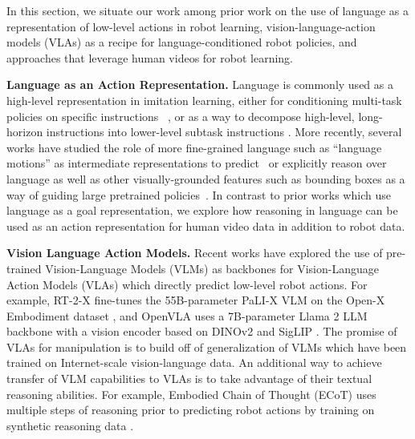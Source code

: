In this section, we situate our work among prior work on the use of language as a representation of low-level actions in robot learning, vision-language-action models (VLAs) as a recipe for language-conditioned robot policies, and approaches that leverage human videos for robot learning.




\noindent \textbf{Language as an Action Representation.}
Language is commonly used as a high-level representation in imitation learning, either for conditioning multi-task policies on specific instructions  ~\citep{stepputtis2020language, jang2022bc, rt12022, rt22023, kim2024openvla}, or as a way to decompose high-level, long-horizon instructions into lower-level subtask instructions \citep{brohan2023do, huang2023inner, shi2024yell}. More recently, several works have studied the role of more fine-grained language such as ``language motions'' as intermediate representations to predict~\cite{belkhale2024rt} or explicitly reason over language as well as other visually-grounded features such as bounding boxes as a way of guiding large pretrained policies~\cite{zawalski2024robotic}. In contrast to prior works which use language as a goal representation, we explore how reasoning in language can be used as an action representation for human video data in addition to robot data.

\noindent \textbf{Vision Language Action Models.}
Recent works have explored the use of pre-trained Vision-Language Models (VLMs) as backbones for Vision-Language Action Models (VLAs) which directly predict low-level robot actions. For example, RT-2-X \cite{oxe2024} fine-tunes the 55B-parameter PaLI-X VLM \cite{chen2024palix} on the Open-X Embodiment dataset \cite{oxe2024}, and OpenVLA \cite{kim2024openvla} uses a 7B-parameter Llama 2 LLM backbone with a vision encoder based on DINOv2 \cite{oquab2023dinov2} and SigLIP \cite{zhai2023sigmoid}. The promise of VLAs for manipulation is to build off of generalization of VLMs which have been trained on Internet-scale vision-language data. An additional way to achieve transfer of VLM capabilities to VLAs is to take advantage of their textual reasoning abilities. For example, Embodied Chain of Thought (ECoT) uses multiple steps of reasoning prior to predicting robot actions by training on synthetic reasoning data \cite{zawalski2024robotic}.



